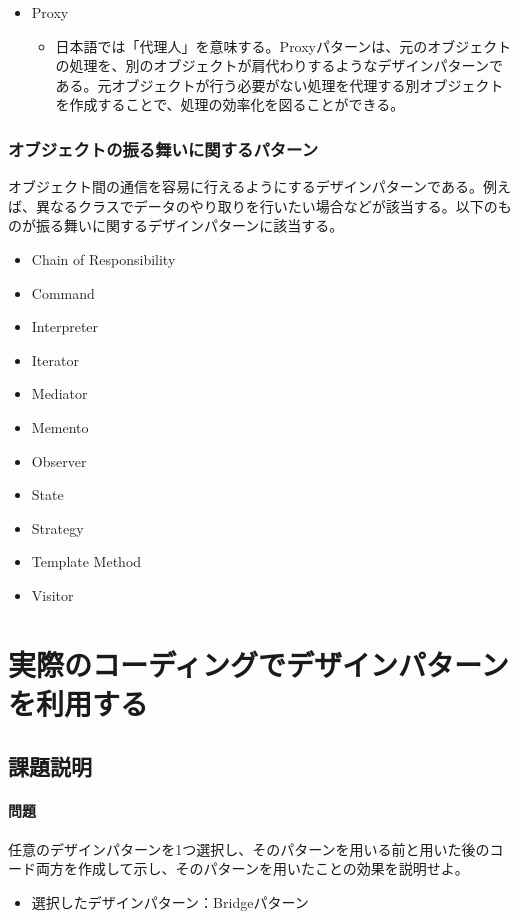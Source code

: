 \documentclass[dvipdfmx]{jsarticle}
\begin{document}
\begin{itemize}
\begin{itemize}
  \end{itemize}
  \item Proxy
  \begin{itemize}
    \item 日本語では「代理人」を意味する。Proxyパターンは、元のオブジェクトの処理を、別のオブジェクトが肩代わりするようなデザインパターンである。元オブジェクトが行う必要がない処理を代理する別オブジェクトを作成することで、処理の効率化を図ることができる。
  \end{itemize}
\end{itemize}
\subsubsection{オブジェクトの振る舞いに関するパターン}
オブジェクト間の通信を容易に行えるようにするデザインパターンである。例えば、異なるクラスでデータのやり取りを行いたい場合などが該当する。以下のものが振る舞いに関するデザインパターンに該当する。
\begin{itemize}
  \item Chain of Responsibility
  \item Command
  \item Interpreter
  \item Iterator
  \item Mediator
  \item Memento
  \item Observer
  \item State
  \item Strategy
  \item Template Method
  \item Visitor
\end{itemize}



\section{実際のコーディングでデザインパターンを利用する}
\subsection{課題説明}
\paragraph{問題} 任意のデザインパターンを1つ選択し、そのパターンを用いる前と用いた後のコード両方を作成して示し、そのパターンを用いたことの効果を説明せよ。
\begin{itemize}
  \item 選択したデザインパターン：Bridgeパターン
\end{itemize}
\end{document}
